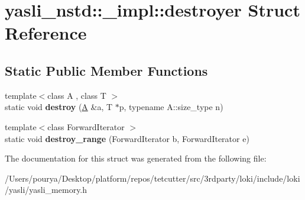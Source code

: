 \hypertarget{structyasli__nstd_1_1__impl_1_1destroyer}{}\section{yasli\+\_\+nstd\+:\+:\+\_\+impl\+:\+:destroyer Struct Reference}
\label{structyasli__nstd_1_1__impl_1_1destroyer}
\subsection*{Static Public Member Functions}
\begin{DoxyCompactItemize}
\item 
\hypertarget{structyasli__nstd_1_1__impl_1_1destroyer_a03879498a4aa44144c56dda10647d01d}{}{\footnotesize template$<$class A , class T $>$ }\\static void {\bfseries destroy} (\hyperlink{structA}{A} \&a, T $\ast$p, typename A\+::size\+\_\+type n)\label{structyasli__nstd_1_1__impl_1_1destroyer_a03879498a4aa44144c56dda10647d01d}

\item 
\hypertarget{structyasli__nstd_1_1__impl_1_1destroyer_a801928cc1f5c4230e5f544c05e1c76da}{}{\footnotesize template$<$class Forward\+Iterator $>$ }\\static void {\bfseries destroy\+\_\+range} (Forward\+Iterator b, Forward\+Iterator e)\label{structyasli__nstd_1_1__impl_1_1destroyer_a801928cc1f5c4230e5f544c05e1c76da}

\end{DoxyCompactItemize}


The documentation for this struct was generated from the following file\+:\begin{DoxyCompactItemize}
\item 
/\+Users/pourya/\+Desktop/platform/repos/tetcutter/src/3rdparty/loki/include/loki/yasli/yasli\+\_\+memory.\+h\end{DoxyCompactItemize}

